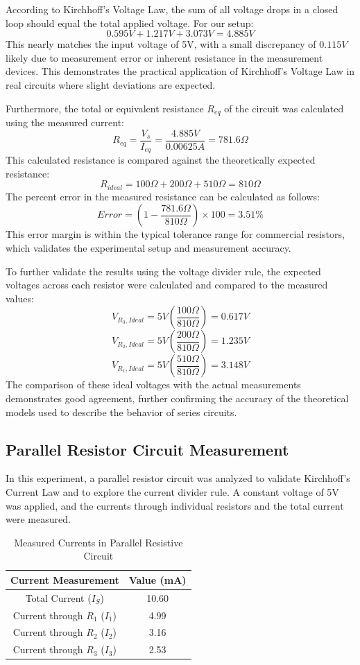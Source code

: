 \documentclass[12pt]{article}
\begin{document}
According to Kirchhoff's Voltage Law, the sum of all voltage drops in a closed loop should equal the total applied voltage. For our setup:
\[
	0.595V + 1.217V + 3.073V = 4.885V
\]
This nearly matches the input voltage of 5V, with a small discrepancy of \(0.115V\) likely due to measurement error or inherent resistance in the measurement devices. This demonstrates the practical application of Kirchhoff's Voltage Law in real circuits where slight deviations are expected.

Furthermore, the total or equivalent resistance \( R_{eq} \) of the circuit was calculated using the measured current:
\[
	R_{eq} = \frac{V_{s}}{I_{eq}} = \frac{4.885V}{0.00625A} = 781.6\Omega
\]
This calculated resistance is compared against the theoretically expected resistance:
\[
	R_{ideal} = 100\Omega + 200\Omega + 510\Omega = 810\Omega
\]
The percent error in the measured resistance can be calculated as follows:
\[
	Error = \left(1 - \frac{781.6\Omega}{810\Omega}\right) \times 100 = 3.51\%
\]
This error margin is within the typical tolerance range for commercial resistors, which validates the experimental setup and measurement accuracy.

To further validate the results using the voltage divider rule, the expected voltages across each resistor were calculated and compared to the measured values:
\[
	V_{R_3, Ideal} = 5V \left(\frac{100\Omega}{810\Omega}\right) = 0.617V
\]
\[
	V_{R_2, Ideal} = 5V \left(\frac{200\Omega}{810\Omega}\right) = 1.235V
\]
\[
	V_{R_1, Ideal} = 5V \left(\frac{510\Omega}{810\Omega}\right) = 3.148V
\]
The comparison of these ideal voltages with the actual measurements demonstrates good agreement, further confirming the accuracy of the theoretical models used to describe the behavior of series circuits.

\subsection{Parallel Resistor Circuit Measurement}
In this experiment, a parallel resistor circuit was analyzed to validate Kirchhoff's Current Law and to explore the current divider rule. A constant voltage of 5V was applied, and the currents through individual resistors and the total current were measured.

\begin{table}[H]
	\centering
	\begin{tabular}{|c|c|}
		\hline
		\textbf{Current Measurement}      & \textbf{Value (mA)} \\
		\hline
		Total Current (\(I_S\))           & 10.60               \\
		Current through \(R_1\) (\(I_1\)) & 4.99                \\
		Current through \(R_2\) (\(I_2\)) & 3.16                \\
		Current through \(R_3\) (\(I_3\)) & 2.53                \\
		\hline
	\end{tabular}
	\caption{Measured Currents in Parallel Resistive Circuit}
	\label{tab:parallel_data}
\end{table}
\end{document}
